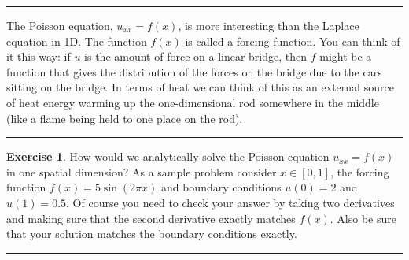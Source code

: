 \documentclass[
]{book}
\theoremstyle{definition}
\theoremstyle{definition}
\theoremstyle{definition}
\newtheorem{exercise}{Exercise}[chapter]
\theoremstyle{remark}
\begin{document}
\begin{center}\rule{0.5\linewidth}{0.5pt}\end{center}

The Poisson equation, \(u_{xx} = f(x)\), is more interesting than the Laplace equation in 1D. The function \(f(x)\) is called a forcing function. You can think of it this way: if \(u\) is the amount of force on a linear bridge, then \(f\) might be a function that gives the distribution of the forces on the bridge due to the cars sitting on the bridge. In terms of heat we can think of this as an external source of heat energy warming up the one-dimensional rod somewhere in the middle (like a flame being held to one place on the rod).

\begin{center}\rule{0.5\linewidth}{0.5pt}\end{center}

\begin{exercise}
\protect\hypertarget{exr:unnamed-chunk-600}{}{\label{exr:unnamed-chunk-600} }How would we analytically solve the Poisson equation \(u_{xx} = f(x)\) in one spatial dimension? As a sample problem consider \(x\in [0,1]\), the forcing function \(f(x) = 5\sin(2 \pi x)\) and boundary conditions \(u(0) = 2\) and \(u(1) = 0.5\). Of course you need to check your answer by taking two derivatives and making sure that the second derivative exactly matches \(f(x)\). Also be sure that your solution matches the boundary conditions exactly.
\end{exercise}

\begin{center}\rule{0.5\linewidth}{0.5pt}\end{center}
\end{document}
